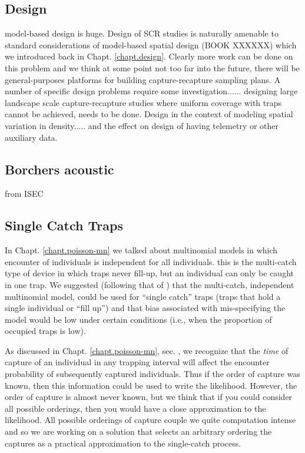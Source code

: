\subsection{Design}

model-based design is huge. Design of SCR studies is naturally
amenable to standard considerations of model-based spatial design
(BOOK XXXXXX) which we introduced back in
Chapt. \ref{chapt.design}. Clearly more work can be done on this
problem and we think at some point not too far into the future, there
will be general-purposes platforms for building capture-recapture
sampling plans.
A number of specific design problems require some
investigation...... designing large landscape scale capture-recapture
studies where uniform coverage with traps cannot be achieved, needs
to be done.
Design in the context of modeling spatial variation in
density..... and the effect on design of having telemetry or other
auxiliary data.


\subsection{Borchers acoustic}

from ISEC

\subsection{Single Catch Traps}

In Chapt. \ref{chapt.poisson-mn} we talked about multinomial models in
which encounter of individuals is independent for all
individuals. this is
the multi-catch type of device in which traps never fill-up, but an
individual can only be caught in one trap.
We suggested (following that of \citet{efford_etal:2009euring}) 
that the multi-catch,
independent multinomial model, could be used for ``single catch''
traps (traps that hold a single individual or ``fill up'') and that
bias associated with mis-specifying the model would be low under
certain conditions (i.e., when the proportion of occupied traps
is low). 


As discussed in Chapt. \ref{chapt.poisson-mn}, 
sec. \label{poisson-mn.sec.singlecatch},
we recognize that the {\it time} of capture of an
individual in any trapping interval will affect the encounter
probability of subsequently captured individuals.  Thus if 
the order of capture was known, then this information could be 
used to write the likelihood.  However, the order of capture
is almost never known, but we think that if you could consider all
possible orderings, then you would have a close approximation to the
likelihood.  All possible orderings of capture couple we quite
computation intense and so we are working on a solution that selects
an arbitrary ordering the captures as a practical approximation to the
single-catch process. 

